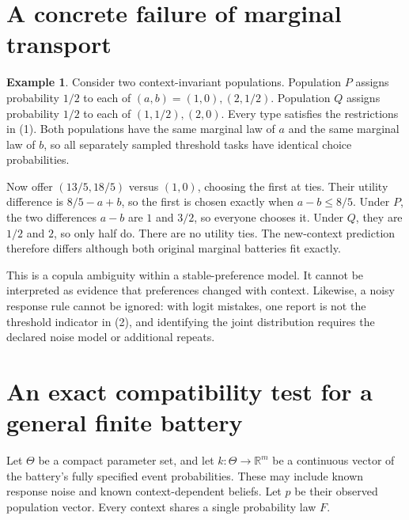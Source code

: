 \documentclass[11pt]{article}
\theoremstyle{definition}
\newtheorem{example}[theorem]{Example}
\begin{document}
\section*{A concrete failure of marginal transport}
\begin{example}
Consider two context-invariant populations. Population $P$ assigns
probability $1/2$ to each of $(a,b)=(1,0),(2,1/2)$. Population $Q$
assigns probability $1/2$ to each of $(1,1/2),(2,0)$. Every type satisfies
the restrictions in (1). Both populations have the same marginal law of
$a$ and the same marginal law of $b$, so all separately sampled threshold
tasks have identical choice probabilities.

Now offer $(13/5,18/5)$ versus $(1,0)$, choosing the first at ties.
Their utility difference is $8/5-a+b$, so the first is chosen exactly
when $a-b\le8/5$. Under $P$, the two differences $a-b$ are $1$ and
$3/2$, so everyone chooses it. Under $Q$, they are $1/2$ and $2$,
so only half do. There are no utility ties. The new-context prediction
therefore differs although both original marginal batteries fit exactly.
\end{example}
This is a copula ambiguity within a stable-preference model. It cannot
be interpreted as evidence that preferences changed with context.
Likewise, a noisy response rule cannot be ignored: with logit mistakes,
one report is not the threshold indicator in (2), and identifying the
joint distribution requires the declared noise model or additional repeats.

\section*{An exact compatibility test for a general finite battery}
Let $\Theta$ be a compact parameter set, and let
$k:\Theta\to\mathbb R^m$ be a continuous vector of the battery's
fully specified event probabilities. These may include known response
noise and known context-dependent beliefs. Let $p$ be their observed
population vector. Every context shares a single probability law $F$.
\end{document}
